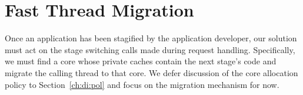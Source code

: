 \documentclass[12pt,a4paper]{book}
\begin{document}
\section{Fast Thread Migration}\label{ch:di:mig}
Once an application has been stagified by the application developer, our solution must act on the stage switching calls made during request handling.
Specifically, we must find a core whose private caches contain the next stage's code and migrate the calling thread to that core.
We defer discussion of the core allocation policy to Section~\ref{ch:di:pol} and focus on the migration mechanism for now.
\end{document}
